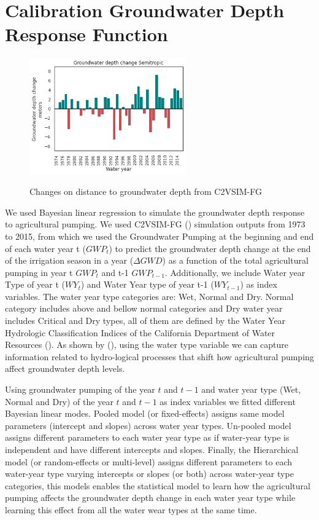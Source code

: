 \documentclass[11pt,a4paper]{article}
\begin{document}
\section{Calibration Groundwater Depth Response Function}

\begin{figure}[H]
\centering
    \includegraphics[width=0.6\textwidth]{Depth_change_semitropic}
    \label{fig:mesh1}
    \caption{Changes on distance to groundwater depth from C2VSIM-FG}
\end{figure}

We used Bayesian linear regression to simulate the groundwater depth response to agricultural pumping. We used C2VSIM-FG (\cite{dwr_c2vsimfg_2021}) simulation outputs from 1973 to 2015, from which we used the Groundwater Pumping at the beginning and end of each water year t ($GWP_{t}$) to predict the groundwater depth change at the end of the irrigation season in a year ($\Delta{GWD}$) as a function of the total agricultural pumping in year t $GWP_t$ and t-1 $GWP_{t-1}$. Additionally, we include Water year Type of year t ($WY_{t}$) and Water Year type of year t-1 ($WY_{t-1}$) as index variables. The water year type categories are: Wet, Normal and Dry. Normal category includes above and bellow normal categories and Dry water year includes Critical and Dry types, all of them are defined by the Water Year Hydrologic Classification Indices of the California Department of Water Resources (\cite{dwr_california_2020}). As shown by (\cite{macewan_hydroeconomic_2017}), using the water type variable we can capture information related to hydro-logical processes that shift how agricultural pumping affect groundwater depth levels.

Using groundwater pumping of the year $t$ and $t-1$ and water year type (Wet, Normal and Dry) of the year $t$ and $t-1$ as index variables we fitted different Bayesian linear modes. Pooled model (or fixed-effects) assigns same model parameters (intercept and slopes) across water year types. Un-pooled model assigns different parameters to each water year type as if water-year type is independent and have different intercepts and slopes. Finally, the Hierarchical model (or random-effects or multi-level) assigns different parameters to each water-year type varying intercepts or slopes (or both) across water-year type categories, this models enables the statistical model to learn how the agricultural pumping affects the groundwater depth change in each water year type while learning this effect from all the water wear types at the same time. 
\end{document}
